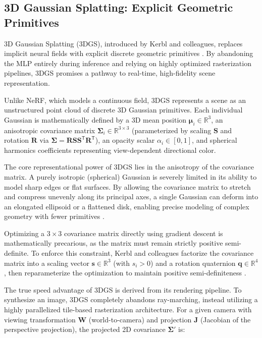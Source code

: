 \documentclass[12pt,a4paper,oneside]{report}
\begin{document}
\subsection{3D Gaussian Splatting: Explicit Geometric Primitives}

3D Gaussian Splatting (3DGS), introduced by Kerbl and colleagues, replaces implicit neural fields with explicit discrete geometric primitives \cite{kerbl20233d}. By abandoning the MLP entirely during inference and relying on highly optimized rasterization pipelines, 3DGS promises a pathway to real-time, high-fidelity scene representation.

Unlike NeRF, which models a continuous field, 3DGS represents a scene as an unstructured point cloud of discrete 3D Gaussian primitives. Each individual Gaussian is mathematically defined by a 3D mean position $\boldsymbol{\mu}_i \in \mathbb{R}^3$, an anisotropic covariance matrix $\boldsymbol{\Sigma}_i \in \mathbb{R}^{3 \times 3}$ (parameterized by scaling $\mathbf{S}$ and rotation $\mathbf{R}$ via $\boldsymbol{\Sigma} = \mathbf{R} \mathbf{S} \mathbf{S}^\mathsf{T} \mathbf{R}^\mathsf{T}$), an opacity scalar $\alpha_i \in [0, 1]$, and spherical harmonics coefficients representing view-dependent directional color.

The core representational power of 3DGS lies in the anisotropy of the covariance matrix. A purely isotropic (spherical) Gaussian is severely limited in its ability to model sharp edges or flat surfaces. By allowing the covariance matrix to stretch and compress unevenly along its principal axes, a single Gaussian can deform into an elongated ellipsoid or a flattened disk, enabling precise modeling of complex geometry with fewer primitives \cite{kerbl20233d}.

Optimizing a $3 \times 3$ covariance matrix directly using gradient descent is mathematically precarious, as the matrix must remain strictly positive semi-definite. To enforce this constraint, Kerbl and colleagues factorize the covariance matrix into a scaling vector $\mathbf{s} \in \mathbb{R}^3$ (with $s_i > 0$) and a rotation quaternion $\mathbf{q} \in \mathbb{R}^4$, then reparameterize the optimization to maintain positive semi-definiteness \cite{kerbl20233d}.

The true speed advantage of 3DGS is derived from its rendering pipeline. To synthesize an image, 3DGS completely abandons ray-marching, instead utilizing a highly parallelized tile-based rasterization architecture. For a given camera with viewing transformation $\mathbf{W}$ (world-to-camera) and projection $\mathbf{J}$ (Jacobian of the perspective projection), the projected 2D covariance $\boldsymbol{\Sigma}'$ is:
\end{document}

